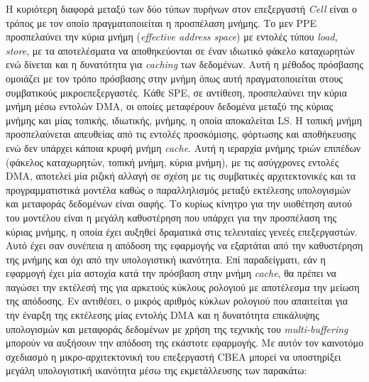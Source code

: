 Η κυριότερη διαφορά μεταξύ των δύο τύπων πυρήνων στον επεξεργαστή \textsl{Cell} είναι ο τρόπος με τον οποίο πραγματοποιείται η προσπέλαση μνήμης. Το μεν \ac{PPE} προσπελαύνει την κύρια μνήμη (\textsl{effective address space}) με εντολές τύπου \textsl{load, store}, με τα αποτελέσματα να αποθηκεύονται σε έναν ιδιωτικό φάκελο καταχωρητών ενώ δίνεται και η δυνατότητα για \textsl{caching} των δεδομένων. Αυτή η μέθοδος πρόσβασης ομοιάζει με τον τρόπο πρόσβασης στην μνήμη όπως αυτή πραγματοποιείται στους συμβατικούς μικροεπεξεργαστές.\newline \indent
Κάθε \ac{SPE}, σε αντίθεση, προσπελαύνει την κύρια μνήμη μέσω εντολών \acf{DMA}, οι οποίες μεταφέρουν δεδομένα μεταξύ της κύριας μνήμης και μίας τοπικής, ιδιωτικής, μνήμης, η οποία αποκαλείται \acf{LS}. Η τοπική μνήμη προσπελαύνεται απευθείας από τις εντολές προσκόμισης, φόρτωσης και αποθήκευσης ενώ δεν υπάρχει κάποια κρυφή μνήμη \textsl{cache}. Αυτή η ιεραρχία μνήμης τριών επιπέδων (φάκελος καταχωρητών, τοπική μνήμη, κύρια μνήμη), με τις ασύγχρονες εντολές \ac{DMA}, αποτελεί μία ριζική αλλαγή σε σχέση με τις συμβατικές αρχιτεκτονικές και τα προγραμματιστικά μοντέλα καθώς ο παραλληλισμός μεταξύ εκτέλεσης υπολογισμών και μεταφοράς δεδομένων είναι σαφής.\newline \indent
Το κυρίως κίνητρο για την υιοθέτηση αυτού του μοντέλου είναι η μεγάλη καθυστέρηση που υπάρχει για την προσπέλαση της κύριας μνήμης, η οποία έχει αυξηθεί δραματικά στις τελευταίες γενεές επεξεργαστών. Αυτό έχει σαν συνέπεια η απόδοση της εφαρμογής να εξαρτάται από την καθυστέρηση της μνήμης και όχι από την υπολογιστική ικανότητα. Επί παραδείγματι, εάν η εφαρμογή έχει μία αστοχία κατά την πρόσβαση στην μνήμη \textsl{cache}, θα πρέπει να παγώσει την εκτέλεσή της για αρκετούς κύκλους ρολογιού με αποτέλεσμα την μείωση της απόδοσης. Εν αντιθέσει, ο μικρός αριθμός κύκλων ρολογιού που απαιτείται για την έναρξη της εκτέλεσης μίας εντολής \ac{DMA} και η δυνατότητα επικάλυψης υπολογισμών και μεταφοράς δεδομένων με χρήση της τεχνικής του \textsl{multi-buffering} μπορούν να αυξήσουν την απόδοση της εκάστοτε εφαρμογής.\newline \indent
Με αυτόν τον καινοτόμο σχεδιασμό η μικρο-αρχιτεκτονική του επεξεργαστή \ac{CBEA} μπορεί να υποστηρίξει μεγάλη υπολογιστική ικανότητα μέσω της εκμετάλλευσης των παρακάτω:


